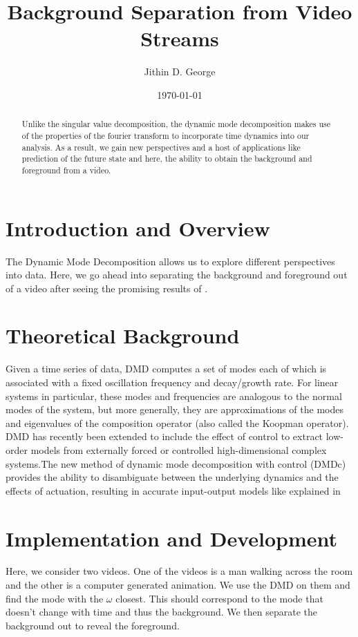 \documentclass[a4paper]{article}
\title{Background Separation from Video Streams}
\author{Jithin D. George}
\date{\today}
\begin{document}
\maketitle

\begin{abstract}
Unlike the singular value decomposition, the dynamic mode decomposition makes use of the properties of the fourier transform to incorporate time dynamics into our analysis. As a result, we gain new perspectives and a host of applications like prediction of the future state and here, the ability to obtain the background and foreground from a video.
\end{abstract}

\section{Introduction and Overview}
\label{sec:introduction}


 The Dynamic Mode Decomposition allows us to explore different perspectives into data. Here, we go ahead into separating the background and foreground out of a video after seeing the promising results of \cite{key-2}.
\section{Theoretical Background}
\label{sec:theory}

Given a time series of data, DMD computes a set of modes each of which is associated with a fixed oscillation frequency and decay/growth rate. For linear systems in particular, these modes and frequencies are analogous to the normal modes of the system, but more generally, they are approximations of the modes and eigenvalues of the composition operator (also called the Koopman operator). DMD has recently been extended to include the effect of control to extract low-order models from externally forced or controlled high-dimensional complex systems.The new method of dynamic mode decomposition with control (DMDc) provides the ability to disambiguate between the underlying dynamics and the effects of actuation, resulting in accurate input-output models like explained in \cite{key-1}
\section{Implementation and Development}


Here, we consider two videos. One of the videos is a man walking across the room and the other is a computer generated animation. We use the DMD on them and find the mode with the  $\omega$ closest. This should correspond to the mode that doesn't change with time and thus the background. We then separate the background out to reveal the foreground.
\end{document}
